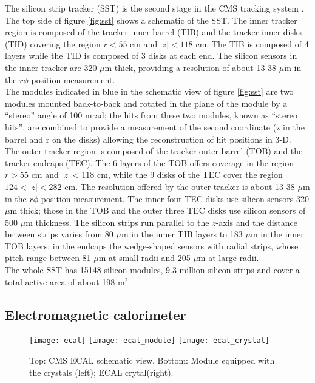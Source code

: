 \noindent The silicon strip tracker (SST) is the second stage in the CMS tracking system . The top side of figure \ref{fig:sst} shows a schematic of the SST. The inner tracker region is composed of the tracker inner barrel (TIB) and the tracker inner disks (TID) covering the region $r<55$ cm and $|z|<118$ cm. The TIB is composed of 4 layers while the TID is composed of 3 disks at each end. The silicon sensors in the inner tracker are 320 $\mu$m thick, providing a resolution of about 13-38 $\mu$m in the $r\phi$ position measurement. \\

\noindent The modules indicated in blue in the schematic view of figure \ref{fig:sst} are two modules mounted back-to-back and rotated in the plane of the module by a ``stereo'' angle of 100 mrad; the hits from these two modules, known as ``stereo hits'', are combined to provide a measurement of the second coordinate (z in the barrel and r on the disks) allowing the reconstruction of hit positions in 3-D.\\ 

\noindent The outer tracker region is composed of the tracker outer barrel (TOB) and the tracker endcaps (TEC). The 6 layers of the TOB offers coverage in the region $r>55$ cm and $|z|<118$ cm, while the 9 disks of the TEC cover the region $124<|z|<282$ cm. The resolution offered by the outer tracker is about 13-38 $\mu$m in the $r\phi$ position measurement. The inner four TEC disks use silicon sensors 320 $\mu$m thick; those in the TOB and the outer three TEC disks use silicon sensors of 500 $\mu$m thickness. The silicon strips run parallel to the $z$-axis and the distance between strips varies from 80 $\mu$m in the inner TIB layers to 183 $\mu$m in the inner TOB layers; in the endcaps the wedge-shaped sensors with radial strips, whose pitch range between 81 $\mu$m at small radii and 205 $\mu$m at large radii.\\ 

\noindent The whole SST has 15148 silicon modules, 9.3 million silicon strips and cover a total active area of about 198 m$^2$ 

\subsection{Electromagnetic calorimeter}
\begin{figure}[h!]
  \centering
  \texttt{[image: ecal]}
  \texttt{[image: ecal\_module]}
  \texttt{[image: ecal\_crystal]} 
  \caption[CMS ECAL schematic view]{Top: CMS ECAL schematic view. Bottom: Module equipped with the crystals (left); ECAL crytal(right).}
  \label{fig:ecal}
\end{figure}

